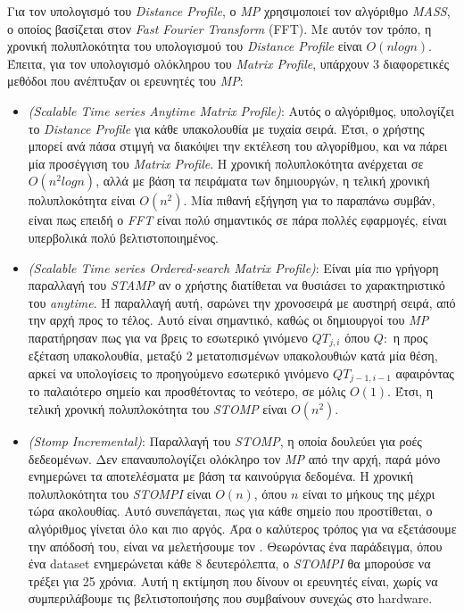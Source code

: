 Για τον υπολογισμό του \emph{Distance Profile}, ο \emph{MP} χρησιμοποιεί τον αλγόριθμο \emph{MASS}, ο οποίος βασίζεται στον \emph{Fast Fourier Transform} (FFT). Με αυτόν τον τρόπο, η χρονική πολυπλοκότητα του υπολογισμού του \emph{Distance Profile} είναι $O(nlog n)$.
Έπειτα, για τον υπολογισμό ολόκληρου του \emph{Matrix Profile}, υπάρχουν 3 διαφορετικές μεθόδοι που ανέπτυξαν οι ερευνητές του \emph{MP}:
\begin{itemize}
    \item \emph{ (Scalable Time series Anytime Matrix Profile)}: Αυτός ο αλγόριθμος, υπολογίζει το \emph{Distance Profile} για κάθε υπακολουθία με τυχαία σειρά. Έτσι, ο χρήστης μπορεί ανά πάσα στιμγή να διακόψει την εκτέλεση του αλγορίθμου, και να πάρει μία προσέγγιση του \emph{Matrix Profile}. Η χρονική πολυπλοκότητα ανέρχεται σε $O(n^2log n)$, αλλά με βάση τα πειράματα των δημιουργών, η τελική χρονική πολυπλοκότητα είναι $O(n^2)$. Μία πιθανή εξήγηση για το παραπάνω συμβάν, είναι πως επειδή ο \emph{FFT} είναι πολύ σημαντικός σε πάρα πολλές εφαρμογές, είναι υπερβολικά πολύ βελτιστοποιημένος.
\item  \emph{ (Scalable Time series Ordered-search Matrix Profile)}: Είναι μία πιο γρήγορη παραλλαγή του \emph{STAMP} αν ο χρήστης διατίθεται να θυσιάσει το χαρακτηριστικό του \emph{anytime}. Η παραλλαγή αυτή, σαρώνει την χρονοσειρά με αυστηρή σειρά, από την αρχή προς το τέλος. Αυτό είναι σημαντικό, καθώς οι δημιουργοί του \emph{MP} παρατήρησαν πως για να βρεις το εσωτερικό γινόμενο $QT_{j,i}$ όπου $Q:$ η προς εξέταση υπακολουθία, μεταξύ 2 μετατοπισμένων υπακολουθιών κατά μία θέση, αρκεί να υπολογίσεις το προηγούμενο εσωτερικό γινόμενο $QT_{j-1,i-1}$ αφαιρόντας το παλαιότερο σημείο και προσθέτοντας το νεότερο, σε μόλις $O(1)$. Έτσι, η τελική χρονική πολυπλοκότητα του \emph{STOMP} είναι $O(n^2)$.
\item \emph{ (Stomp Incremental)}: Παραλλαγή του \emph{STOMP}, η οποία δουλεύει για ροές δεδεομένων. Δεν επαναυπολογίζει ολόκληρο τον \emph{MP} από την αρχή, παρά μόνο ενημερώνει τα αποτελέσματα με βάση τα καινούργια δεδομένα. Η χρονική πολυπλοκότητα του \emph{STOMPI} είναι $O(n)$, όπου $n$ είναι το μήκους της μέχρι τώρα ακολουθίας. Αυτό συνεπάγεται, πως για κάθε σημείο που προστίθεται, ο αλγόριθμος γίνεται όλο και πιο αργός. Άρα ο καλύτερος τρόπος για να εξετάσουμε την απόδοσή του, είναι να μελετήσουμε τον . Θεωρόντας ένα παράδειγμα, όπου ένα dataset ενημερώνεται κάθε 8 δευτερόλεπτα, ο \emph{STOMPI} θα μπορούσε να τρέξει για 25 χρόνια. Αυτή η εκτίμηση που δίνουν οι ερευνητές είναι, χωρίς να συμπεριλάβουμε τις βελτιστοποιήσης που συμβαίνουν συνεχώς στο hardware.
\end{itemize}

